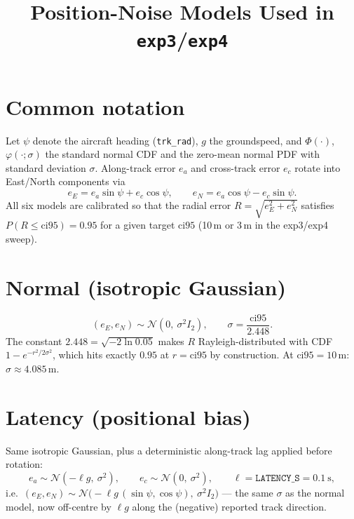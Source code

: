 \documentclass[11pt]{article}
\title{Position-Noise Models Used in \texttt{exp3}/\texttt{exp4}}
\author{}
\date{}
\newcommand{\ci}{\mathrm{ci95}}
\begin{document}
\maketitle

\section*{Common notation}
Let $\psi$ denote the aircraft heading (\texttt{trk\_rad}), $g$ the groundspeed,
and $\Phi(\cdot)$, $\varphi(\cdot;\sigma)$ the standard normal CDF and the
zero-mean normal PDF with standard deviation $\sigma$. Along-track error
$e_a$ and cross-track error $e_c$ rotate into East/North components via
\begin{equation}
  e_E = e_a \sin\psi + e_c \cos\psi, \qquad
  e_N = e_a \cos\psi - e_c \sin\psi.
\end{equation}
All six models are calibrated so that the radial error
$R = \sqrt{e_E^2 + e_N^2}$ satisfies $P(R \le \ci) = 0.95$ for a given target
$\ci$ (10\,m or 3\,m in the exp3/exp4 sweep).

\section{Normal (isotropic Gaussian)}
\begin{equation}
  (e_E, e_N) \sim \mathcal{N}\!\left(0,\ \sigma^2 I_2\right), \qquad
  \sigma = \frac{\ci}{2.448}.
\end{equation}
The constant $2.448 = \sqrt{-2\ln 0.05}$ makes $R$ Rayleigh-distributed with
CDF $1 - e^{-r^2/2\sigma^2}$, which hits exactly $0.95$ at $r = \ci$ by
construction. At $\ci = 10$\,m: $\sigma \approx 4.085$\,m.

\section{Latency (positional bias)}
Same isotropic Gaussian, plus a deterministic along-track lag applied before
rotation:
\begin{equation}
  e_a \sim \mathcal{N}(-\ell g,\ \sigma^2), \qquad
  e_c \sim \mathcal{N}(0,\ \sigma^2), \qquad
  \ell = \texttt{LATENCY\_S} = 0.1\ \text{s},
\end{equation}
i.e.\ $(e_E, e_N) \sim \mathcal{N}\big(-\ell g\,(\sin\psi, \cos\psi),\ \sigma^2 I_2\big)$
--- the same $\sigma$ as the normal model, now off-centre by $\ell g$ along
the (negative) reported track direction.
\end{document}
